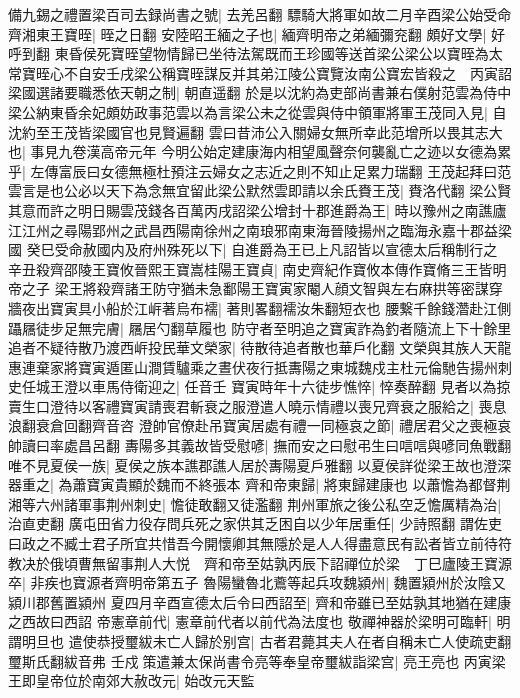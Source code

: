 備九錫之禮置梁百司去録尚書之號|{
	去羌呂翻}
驃騎大將軍如故二月辛酉梁公始受命齊湘東王寶晊|{
	晊之日翻}
安陸昭王緬之子也|{
	緬齊明帝之弟緬彌兖翻}
頗好文學|{
	好呼到翻}
東昏侯死寶晊望物情歸已坐待法駕既而王珍國等送首梁公梁公以寶晊為太常寶晊心不自安壬戌梁公稱寶晊謀反并其弟江陵公寶覽汝南公寶宏皆殺之　丙寅詔梁國選諸要職悉依天朝之制|{
	朝直遥翻}
於是以沈約為吏部尚書兼右僕射范雲為侍中梁公納東昏余妃頗妨政事范雲以為言梁公未之從雲與侍中領軍將軍王茂同入見|{
	自沈約至王茂皆梁國官也見賢遍翻}
雲曰昔沛公入關婦女無所幸此范增所以畏其志大也|{
	事見九卷漢高帝元年}
今明公始定建康海内相望風聲奈何襲亂亡之迹以女德為累乎|{
	左傳富辰曰女德無極杜預注云婦女之志近之則不知止足累力瑞翻}
王茂起拜曰范雲言是也公必以天下為念無宜留此梁公默然雲即請以余氏賚王茂|{
	賚洛代翻}
梁公賢其意而許之明日賜雲茂錢各百萬丙戌詔梁公增封十郡進爵為王|{
	時以豫州之南譙廬江江州之尋陽郢州之武昌西陽南徐州之南琅邪南東海晉陵揚州之臨海永嘉十郡益梁國}
癸巳受命赦國内及府州殊死以下|{
	自進爵為王已上凡詔皆以宣德太后稱制行之}
辛丑殺齊邵陵王寶攸晉熙王寶嵩桂陽王寶貞|{
	南史齊紀作寶攸本傳作寶脩三王皆明帝之子}
梁王將殺齊諸王防守猶未急鄱陽王寶寅家閹人顔文智與左右麻拱等密謀穿牆夜出寶寅具小船於江㟁著烏布襦|{
	著則畧翻襦汝朱翻短衣也}
腰繋千餘錢濳赴江側躡屩徒步足無完膚|{
	屩居勺翻草履也}
防守者至明追之寶寅詐為釣者隨流上下十餘里追者不疑待散乃渡西㟁投民華文榮家|{
	待散待追者散也華戶化翻}
文榮與其族人天龍惠連棄家將寶寅遁匿山澗賃驢乘之晝伏夜行抵夀陽之東城魏戍主杜元倫馳告揚州刺史任城王澄以車馬侍衛迎之|{
	任音壬}
寶寅時年十六徒步憔悴|{
	悴奏醉翻}
見者以為掠賣生口澄待以客禮寶寅請喪君斬衰之服澄遣人曉示情禮以喪兄齊衰之服給之|{
	喪息浪翻衰倉回翻齊音咨}
澄帥官僚赴吊寶寅居處有禮一同極哀之節|{
	禮居君父之喪極哀帥讀曰率處昌呂翻}
夀陽多其義故皆受慰喭|{
	撫而安之曰慰弔生曰唁唁與喭同魚戰翻}
唯不見夏侯一族|{
	夏侯之族本譙郡譙人居於夀陽夏戶雅翻}
以夏侯詳從梁王故也澄深器重之|{
	為蕭寶寅貴顯於魏而不終張本}
齊和帝東歸|{
	將東歸建康也}
以蕭憺為都督荆湘等六州諸軍事荆州刺史|{
	憺徒敢翻又徒濫翻}
荆州軍旅之後公私空乏憺厲精為治|{
	治直吏翻}
廣屯田省力役存問兵死之家供其乏困自以少年居重任|{
	少詩照翻}
謂佐吏曰政之不臧士君子所宜共惜吾今開懷卿其無隱於是人人得盡意民有訟者皆立前待符教决於俄頃曹無留事荆人大悦　齊和帝至姑孰丙辰下詔禪位於梁　丁巳廬陵王寶源卒|{
	非疾也寶源者齊明帝第五子}
魯陽蠻魯北鷰等起兵攻魏潁州|{
	魏置潁州於汝陰又潁川郡舊置潁州}
夏四月辛酉宣德太后令曰西詔至|{
	齊和帝雖已至姑孰其地猶在建康之西故曰西詔}
帝憲章前代|{
	憲章前代者以前代為法度也}
敬禪神器於梁明可臨軒|{
	明謂明旦也}
遣使恭授璽紱未亡人歸於别宫|{
	古者君薨其夫人在者自稱未亡人使疏吏翻璽斯氏翻紱音弗}
壬戍策遣兼太保尚書令亮等奉皇帝璽紱詣梁宫|{
	亮王亮也}
丙寅梁王即皇帝位於南郊大赦改元|{
	始改元天監}
